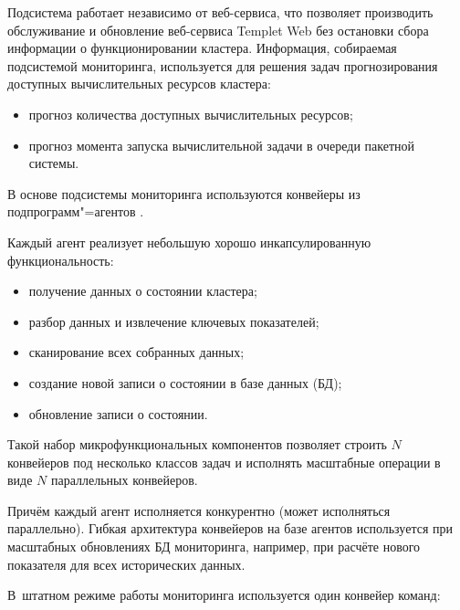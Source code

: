 Подсистема работает независимо от веб-сервиса, что позволяет производить обслуживание и обновление веб-сервиса Templet Web без остановки сбора информации о функционировании кластера. Информация, собираемая подсистемой мониторинга, используется для решения задач прогнозирования доступных вычислительных ресурсов кластера\cite{Artam2014BasesApproaches}:

\begin{itemize}

\item прогноз количества доступных вычислительных ресурсов;

\item прогноз момента запуска вычислительной задачи в очереди пакетной системы.

\end{itemize}



В основе подсистемы мониторинга используются конвейеры из подпрограмм"=агентов \cite{Agha1999Actors}. 

Каждый агент реализует небольшую хорошо инкапсулированную функциональность:

\begin{itemize}

\item получение данных о состоянии кластера;

\item разбор данных и извлечение ключевых показателей;

\item сканирование всех собранных данных;

\item создание новой записи о состоянии в базе данных (БД);

\item обновление записи о состоянии.

\end{itemize}



Такой набор микрофункциональных компонентов позволяет строить $N$ конвейеров под несколько классов задач и исполнять масштабные операции в виде $N$ параллельных конвейеров. 

Причём каждый агент исполняется конкурентно (может исполняться параллельно). Гибкая архитектура конвейеров на базе агентов используется при масштабных обновлениях БД мониторинга, например, при расчёте нового показателя для всех исторических данных. 

В~штатном режиме работы мониторинга используется один конвейер команд:

